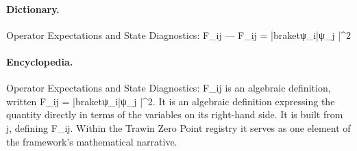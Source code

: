\paragraph{Dictionary.}
Operator Expectations and State Diagnostics: F\_ij — F\_ij = |braketψ\_i|ψ\_j |\textasciicircum{}2

\paragraph{Encyclopedia.}
Operator Expectations and State Diagnostics: F\_ij is an algebraic definition, written F\_ij = |braketψ\_i|ψ\_j |\textasciicircum{}2. It is an algebraic definition expressing the quantity directly in terms of the variables on its right-hand side. It is built from j, defining F\_ij. Within the Trawin Zero Point registry it serves as one element of the framework's mathematical narrative.
